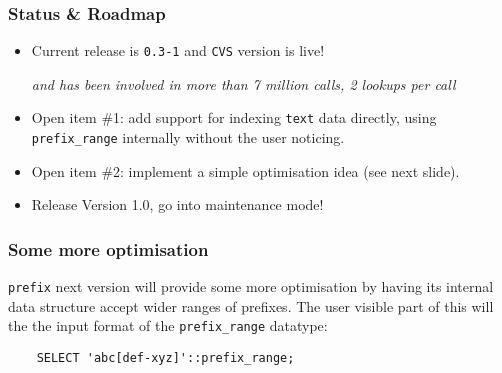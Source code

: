 \documentclass{beamer}
\begin{document}
\begin{frame}[fragile]
  \frametitle{Status \& Roadmap}

  \begin{itemize}

  \item<1-> Current release is \texttt{0.3-1} and \texttt{CVS} version is
    live!

    \textit{and has been involved in more than 7 million calls, 2 lookups
      per call}

   \item<2-> Open item \#1: add support for indexing \texttt{text} data
     directly, using \texttt{prefix\_range} internally without the user
     noticing.

   \item<3-> Open item \#2: implement a simple optimisation idea (see next
     slide).

   \item<4-> Release Version 1.0, go into maintenance mode!

  \end{itemize}
\end{frame}

\begin{frame}[fragile]
  \frametitle{Some more optimisation}
  
  \texttt{prefix} next version will provide some more optimisation by having
  its internal data structure accept wider ranges of prefixes.  The user
  visible part of this will the the input format of the
  \texttt{prefix\_range} datatype:

  \pause

  \begin{example}
  \begin{verbatim}
    SELECT 'abc[def-xyz]'::prefix_range;
  \end{verbatim}
  \end{example}
\end{frame}

\end{document}
